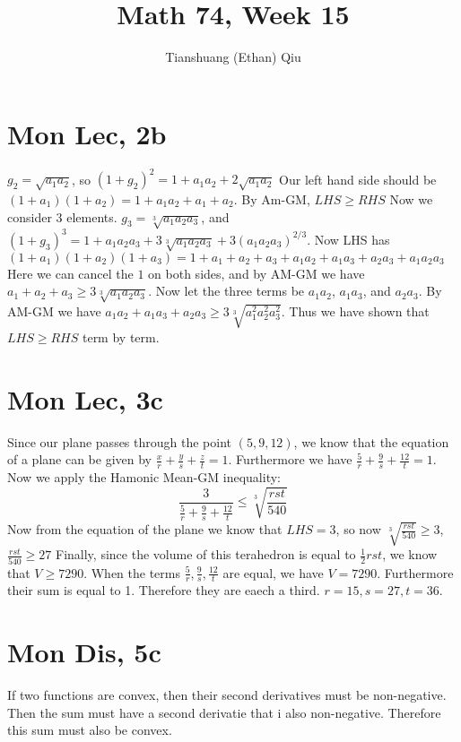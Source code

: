 \documentclass[12pt]{article}
\author{Tianshuang (Ethan) Qiu}
\begin{document}
\title{Math 74, Week 15}
\maketitle

\section{Mon Lec, 2b}
$g_2 = \sqrt{a_1a_2}$, so $(1+g_2)^2 = 1 + a_1a_2 + 2\sqrt{a_1a_2}$
\newline
Our left hand side should be $(1+a_1)(1+a_2) = 1 + a_1a_2 + a_1 + a_2$. By Am-GM, $LHS \geq RHS$
\newline
Now we consider 3 elements. $g_3 = \sqrt[3]{a_1a_2a_3}$, and $(1+g_3)^3 = 1 + a_1a_2a_3 + 3\sqrt[3]{a_1a_2a_3} + 3(a_1a_2a_3)^{2/3}$.
\newline
Now LHS has $(1+a_1)(1+a_2)(1+a_3) = 1 + a_1 + a_2 + a_3 + a_1a_2 + a_1a_3 + a_2a_3 + a_1a_2a_3 $
Here we can cancel the $1$ on both sides, and by AM-GM we have $a_1+a_2+a_3 \geq 3\sqrt[3]{a_1a_2a_3}$. Now let the three terms be $a_1a_2$, $ a_1a_3$, and $ a_2a_3$. By AM-GM we have $a_1a_2 + a_1a_3 + a_2a_3 \geq 3 \sqrt[3]{a_1^2a_2^2a_3^2}$.
\newline
Thus we have shown that $LHS \geq RHS$ term by term.


\section{Mon Lec, 3c}
Since our plane passes through the point $(5,9,12)$, we know that the equation of a plane can be given by $\frac{x}{r} +
\frac{y}{s} + \frac{z}{t} = 1$.
Furthermore we have $\frac{5}{r} + \frac{9}{s} + \frac{12}{t} = 1$. Now we apply the Hamonic Mean-GM inequality:
$$\frac{3}{\frac{5}{r} + \frac{9}{s} + \frac{12}{t}} \leq \sqrt[3]{\frac{rst}{540}}$$
Now from the equation of the plane we know that $LHS = 3$, so now $\sqrt[3]{\frac{rst}{540}} \geq 3$, $\frac{rst}{540} \geq 27$
Finally, since the volume of this terahedron is equal to $\frac{1}{2}rst$, we know that $V \geq 7290$.
\newline
When the terms $\frac{5}{r}, \frac{9}{s},\frac{12}{t}$ are equal, we have $V = 7290$. Furthermore their sum is equal to 1. Therefore they are eaech a third. $r = 15, s = 27, t = 36$.
\newpage


\section{Mon Dis, 5c}
If two functions are convex, then their second derivatives must be non-negative. Then the sum must have a second derivatie that i also non-negative. Therefore this sum must also be convex.
\end{document}
